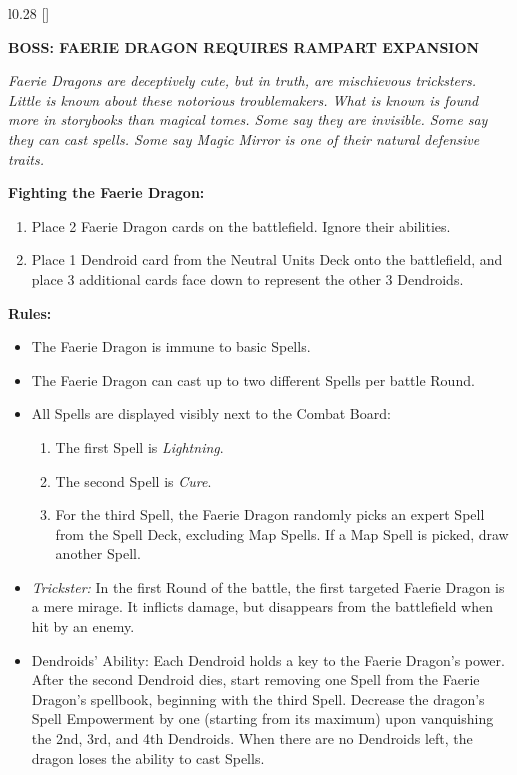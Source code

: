 \begin{wrapfigure}{l}{0.28\textwidth}
  \raisebox{0pt}[\dimexpr{}\baselineskip\relax]{}
\end{wrapfigure}
{
  \textbf{\MakeUppercase{Boss: Faerie Dragon {\scriptsize Requires Rampart Expansion}}}

  \medskip

  \textit{Faerie Dragons are deceptively cute, but in truth, are mischievous tricksters.
    Little is known about these notorious troublemakers.
    What is known is found more in storybooks than magical tomes.
    Some say they are invisible.
    Some say they can cast spells.
    Some say Magic Mirror is one of their natural defensive traits.
  }

  \medskip

  \textbf{Fighting the Faerie Dragon:}
  \begin{enumerate}
    \item Place 2 Faerie Dragon cards on the battlefield.
      Ignore their abilities.
    \item Place 1 Dendroid card from the  Neutral Units Deck onto the battlefield, and place 3 additional cards face down to represent the other 3 Dendroids.
  \end{enumerate}

  \medskip

  \textbf{Rules:}
  \begin{itemize}
    \item The Faerie Dragon is immune to basic Spells.
    \item The Faerie Dragon can cast up to two different Spells per battle Round.
    \item All Spells are displayed visibly next to the Combat Board:
      \begin{enumerate}
        \item The first Spell is \textit{Lightning}.
        \item The second Spell is \textit{Cure}.
        \item For the third Spell, the Faerie Dragon randomly picks an expert Spell from the Spell Deck, excluding Map  Spells.
          If a Map  Spell is picked, draw another Spell.
      \end{enumerate}
    \item \textit{Trickster:} In the first Round of the battle, the first targeted Faerie Dragon is a mere mirage.
      It inflicts damage, but disappears from the battlefield when hit by an enemy.
    \item Dendroids' Ability: Each Dendroid holds a key to the Faerie Dragon's power.
      After the second Dendroid dies, start removing one Spell from the Faerie Dragon's spellbook, beginning with the third Spell.
      Decrease the dragon's Spell Empowerment  by one (starting from its maximum) upon vanquishing the 2nd, 3rd, and 4th Dendroids.
      When there are no Dendroids left, the dragon loses the ability to cast Spells.
  \end{itemize}
}

